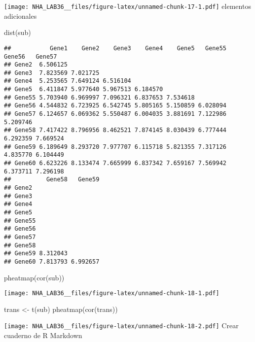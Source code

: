 \documentclass[
]{article}
\newenvironment{Shaded}{\begin{snugshade}}{\end{snugshade}}
\newcommand{\FunctionTok}[1]{\textcolor[rgb]{0.00,0.00,0.00}{#1}}
\newcommand{\NormalTok}[1]{#1}
\newcommand{\OtherTok}[1]{\textcolor[rgb]{0.56,0.35,0.01}{#1}}
\begin{document}
\texttt{[image: NHA\_LAB36\_\_files/figure-latex/unnamed-chunk-17-1.pdf]}
elementos adicionales

\begin{Shaded}
\begin{Highlighting}[]
\FunctionTok{dist}\NormalTok{(sub)}
\end{Highlighting}
\end{Shaded}

\begin{verbatim}
##           Gene1    Gene2    Gene3    Gene4    Gene5   Gene55   Gene56   Gene57
## Gene2  6.506125                                                               
## Gene3  7.823569 7.021725                                                      
## Gene4  5.253565 7.649124 6.516104                                             
## Gene5  6.411847 5.977640 5.967513 6.184570                                    
## Gene55 5.703940 6.969997 7.096321 6.837653 7.534618                           
## Gene56 4.544832 6.723925 6.542745 5.805165 5.150859 6.028094                  
## Gene57 6.124657 6.069362 5.550487 6.004035 3.881691 7.122986 5.209746         
## Gene58 7.417422 8.796956 8.462521 7.874145 8.030439 6.777444 6.292359 7.669524
## Gene59 6.189649 8.293720 7.977707 6.115718 5.821355 7.317126 4.835770 6.104449
## Gene60 6.623226 8.133474 7.665999 6.837342 7.659167 7.569942 6.373711 7.296198
##          Gene58   Gene59
## Gene2                   
## Gene3                   
## Gene4                   
## Gene5                   
## Gene55                  
## Gene56                  
## Gene57                  
## Gene58                  
## Gene59 8.312043         
## Gene60 7.813793 6.992657
\end{verbatim}

\begin{Shaded}
\begin{Highlighting}[]
\FunctionTok{pheatmap}\NormalTok{(}\FunctionTok{cor}\NormalTok{(sub))}
\end{Highlighting}
\end{Shaded}

\texttt{[image: NHA\_LAB36\_\_files/figure-latex/unnamed-chunk-18-1.pdf]}

\begin{Shaded}
\begin{Highlighting}[]
\NormalTok{trans }\OtherTok{\textless{}{-}} \FunctionTok{t}\NormalTok{(sub)}
\FunctionTok{pheatmap}\NormalTok{(}\FunctionTok{cor}\NormalTok{(trans))}
\end{Highlighting}
\end{Shaded}

\texttt{[image: NHA\_LAB36\_\_files/figure-latex/unnamed-chunk-18-2.pdf]}
Crear cuaderno de R Markdown
\end{document}
